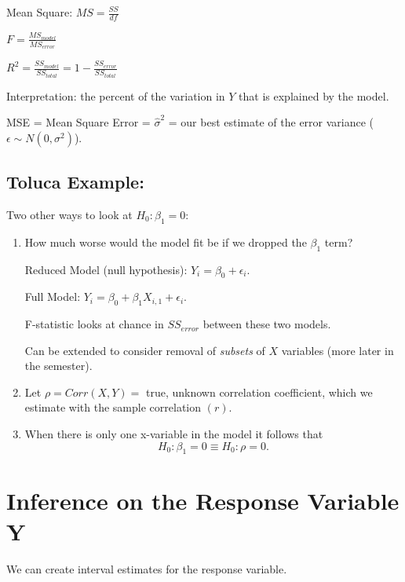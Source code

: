 \documentclass[12pt]{../notes}
\begin{document}
\bi
\item Mean Square: $MS = \frac{SS}{df}$ 
\item $F = \frac{MS_{model}}{MS_{error}}$
\item $R^2 = \frac{SS_{model}}{SS_{total}} = 1 - \frac{SS_{error}}{SS_{total}}$
\bi
\item Interpretation: the percent of the variation in $Y$ that is explained by the model. 
\ei
\item MSE = Mean Square Error = $\hat{\sigma}^2$ = our best estimate of the error variance ($\epsilon \sim N(0, \sigma^2)$).
\ei

\subsection*{Toluca Example:}

\begin{minipage}[l][2cm][c]{\textwidth}
\end{minipage}

Two other ways to look at $H_0: \beta_1 = 0:$

\begin{enumerate}
\item How much worse would the model fit be if we dropped the $\beta_1$ term?

Reduced Model (null hypothesis): $Y_i = \beta_0 + \epsilon_i$. 

Full Model: $Y_i = \beta_0 + \beta_1X_{i,1} + \epsilon_i$.

\nspace
F-statistic looks at chance in $SS_{error}$ between these two models. 

\nspace
Can be extended to consider removal of \textit{subsets} of $X$ variables (more later in the semester).  

\item Let $\rho = Corr(X,Y) = $ true, unknown correlation coefficient, which we estimate with the sample correlation $(r)$. 

\bi
\item When there is only one x-variable in the model it follows that 
\[H_0: \beta_1 = 0 \equiv H_0: \rho = 0.\]
\ei
\end{enumerate}

\section*{Inference on the Response Variable Y}
We can create interval estimates for the response variable. 
\end{document}
